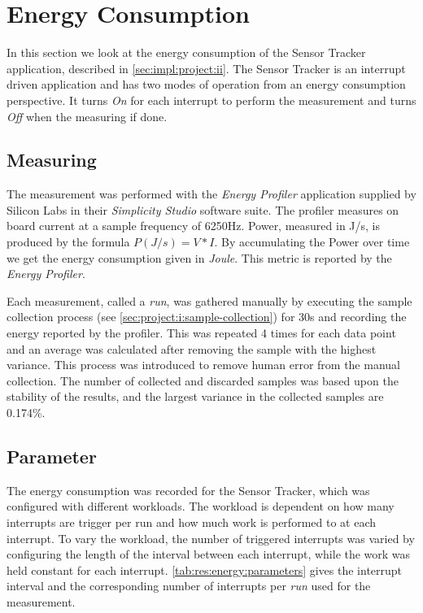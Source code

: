 \section{Energy Consumption}

In this section we look at the energy consumption of the Sensor Tracker application, described in \autoref{sec:impl:project:ii}.
The Sensor Tracker is an interrupt driven application and has two modes of operation from an energy consumption perspective.
It turns \emph{On} for each interrupt to perform the measurement and turns \emph{Off} when the measuring if done.

\subsection{Measuring}
The measurement was performed with the \emph{Energy Profiler} application supplied by Silicon Labs in their \emph{Simplicity Studio} software suite.
The profiler measures on board current at a sample frequency of 6250Hz.
Power, measured in J/s, is produced by the formula $P (J/s) = V*I $.
By accumulating the Power over time we get the energy consumption given in \emph{Joule}.
This metric is reported by the \emph{Energy Profiler}.

Each measurement, called a \emph{run}, was gathered manually by executing the sample collection process (see \autoref{sec:project:i:sample-collection}) for 30s and recording the energy reported by the profiler.
This was repeated 4 times for each data point and an average was calculated after removing the sample with the highest variance.
This process was introduced to remove human error from the manual collection.
The number of collected and discarded samples was based upon the stability of the results, and the largest variance in the collected samples are 0.174\%.

\subsection{Parameter}

The energy consumption was recorded for the Sensor Tracker, which was configured with different workloads.
The workload is dependent on how many interrupts are trigger per run and how much work is performed to at each interrupt.
To vary the workload, the number of triggered interrupts was varied by configuring the length of the interval between each interrupt, while the work was held constant for each interrupt.
\autoref{tab:res:energy:parameters} gives the interrupt interval and the corresponding number of interrupts per \emph{run} used for the measurement.

